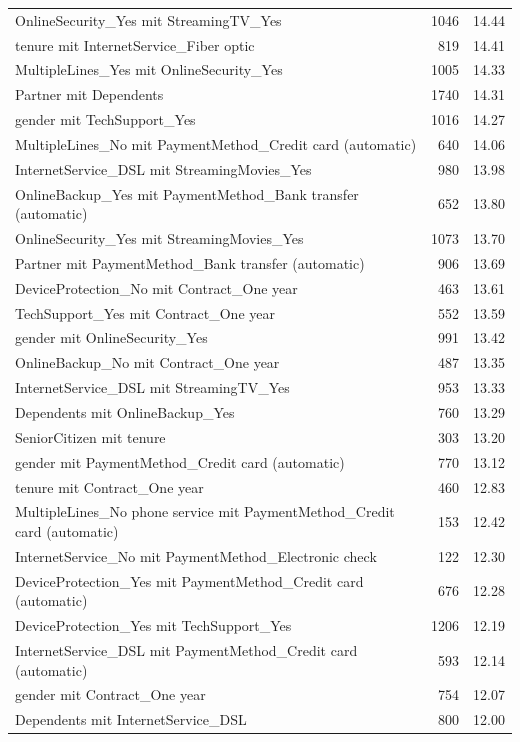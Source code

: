 \documentclass[a4paper,11pt]{article}
\begin{document}
\begin{longtable}{p{9cm}rr}
OnlineSecurity\_Yes mit StreamingTV\_Yes & 1046 & 14.44 \\
tenure mit InternetService\_Fiber optic & 819 & 14.41 \\
MultipleLines\_Yes mit OnlineSecurity\_Yes & 1005 & 14.33 \\
Partner mit Dependents & 1740 & 14.31 \\
gender mit TechSupport\_Yes & 1016 & 14.27 \\
MultipleLines\_No mit PaymentMethod\_Credit card (automatic) & 640 & 14.06 \\
InternetService\_DSL mit StreamingMovies\_Yes & 980 & 13.98 \\
OnlineBackup\_Yes mit PaymentMethod\_Bank transfer (automatic) & 652 & 13.80 \\
OnlineSecurity\_Yes mit StreamingMovies\_Yes & 1073 & 13.70 \\
Partner mit PaymentMethod\_Bank transfer (automatic) & 906 & 13.69 \\
DeviceProtection\_No mit Contract\_One year & 463 & 13.61 \\
TechSupport\_Yes mit Contract\_One year & 552 & 13.59 \\
gender mit OnlineSecurity\_Yes & 991 & 13.42 \\
OnlineBackup\_No mit Contract\_One year & 487 & 13.35 \\
InternetService\_DSL mit StreamingTV\_Yes & 953 & 13.33 \\
Dependents mit OnlineBackup\_Yes & 760 & 13.29 \\
SeniorCitizen mit tenure & 303 & 13.20 \\
gender mit PaymentMethod\_Credit card (automatic) & 770 & 13.12 \\
tenure mit Contract\_One year & 460 & 12.83 \\
MultipleLines\_No phone service mit PaymentMethod\_Credit card (automatic) & 153 & 12.42 \\
InternetService\_No mit PaymentMethod\_Electronic check & 122 & 12.30 \\
DeviceProtection\_Yes mit PaymentMethod\_Credit card (automatic) & 676 & 12.28 \\
DeviceProtection\_Yes mit TechSupport\_Yes & 1206 & 12.19 \\
InternetService\_DSL mit PaymentMethod\_Credit card (automatic) & 593 & 12.14 \\
gender mit Contract\_One year & 754 & 12.07 \\
Dependents mit InternetService\_DSL & 800 & 12.00 \\

\end{longtable}
\end{document}
